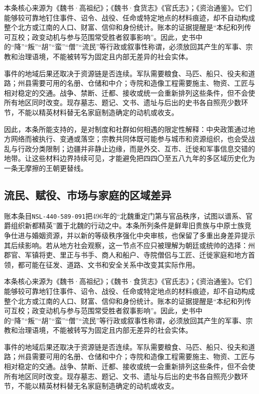 本条核心来源为《魏书·高祖纪》；《魏书·食货志》《官氏志》；《资治通鉴》。它们能够较可靠地钉住事件、诏令、战役、任命或特定地点的材料痕迹，却不自动构成整个北方或江南的人口、财富、信仰和身份统计。账本的证据提醒是“本纪和列传可互校；政变动机与参与范围常受胜者叙事影响”。因此，史书中的“降”“叛”“胡”“蛮”“僧”“流民”等行政或叙事性称谓，必须放回其产生的军事、宗教和治理语境，不能被转写为固定且内部无差异的社会实体。

事件的地域后果还取决于资源链是否连续。军队需要粮食、马匹、船只、役夫和道路；州县需要可用的名册、仓储和中介；寺院和造像工程需要施主、物资、工匠与相对稳定的交通。战争、禁断、迁都、接收或统一会重新排列这些条件，但不会使所有地区同时改变。现存墓志、题记、文书、遗址与后出的史书各自照亮少数环节，不能以精英材料替无名家庭制造确定的动机或收支。

因此，本条所能支持的，是对制度和社群如何相遇的限定性解释：中央政策通过地方网络而被执行、变通或落空；宗教共同体既可能参与城市和资源组织，也会受战乱与行政分类限制；边疆并非静止边缘，而是外交、互市、迁徙和军事信息交错的地带。让这些材料边界持续可见，才能避免把四四〇至五八九年的多区域历史化为一条无摩擦的王朝更替线。

\subsection{流民、赋役、市场与家庭的区域差异}

账本条目\texttt{NSL-440-589-091}把496年的“北魏重定门第与官品秩序，试图以谱系、官爵组织新都精英”置于北魏的行动之中。本条所列条件是鲜卑旧贵族与中原士族竞争仕进与婚姻资源，并以新的等级秩序强化中央审核，也保留了多重出身差异提示其后续影响。若从地方社会观察，这一节点不应只被理解为朝廷或统帅的选择：州郡官、军镇将吏、里正与书手、商人和船户、寺院僧侣与工匠、迁徙家庭和地方首领，都可能在征发、道路、文书和安全关系中改变其实际作用。

本条核心来源为《魏书·高祖纪》；《魏书·食货志》《官氏志》；《资治通鉴》。它们能够较可靠地钉住事件、诏令、战役、任命或特定地点的材料痕迹，却不自动构成整个北方或江南的人口、财富、信仰和身份统计。账本的证据提醒是“本纪和列传可互校；政变动机与参与范围常受胜者叙事影响”。因此，史书中的“降”“叛”“胡”“蛮”“僧”“流民”等行政或叙事性称谓，必须放回其产生的军事、宗教和治理语境，不能被转写为固定且内部无差异的社会实体。

事件的地域后果还取决于资源链是否连续。军队需要粮食、马匹、船只、役夫和道路；州县需要可用的名册、仓储和中介；寺院和造像工程需要施主、物资、工匠与相对稳定的交通。战争、禁断、迁都、接收或统一会重新排列这些条件，但不会使所有地区同时改变。现存墓志、题记、文书、遗址与后出的史书各自照亮少数环节，不能以精英材料替无名家庭制造确定的动机或收支。

